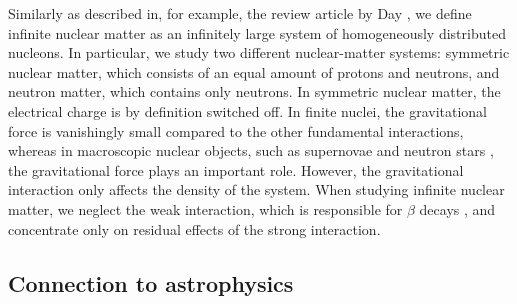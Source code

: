 \documentclass[a4paper,12pt]{report}
\begin{document}
Similarly as described in, for example, the review
article by Day \cite{day1967}, we define infinite nuclear matter
as an infinitely large system of homogeneously distributed 
nucleons. In particular, we study two different 
nuclear-matter systems: symmetric nuclear matter, which consists of 
an equal amount of protons and neutrons, and neutron matter, 
which contains only neutrons. In symmetric nuclear matter,
the electrical charge is by definition switched off. In 
finite nuclei, the gravitational force 
is vanishingly small \cite{wong_book} compared to the other 
fundamental interactions, whereas in macroscopic 
nuclear objects, such as supernovae \cite{janka_2012} 
and neutron stars \cite{heiselberg,lattimer2012}, the 
gravitational force plays an important role. However, the 
gravitational interaction only affects the density of the
system. When studying infinite nuclear matter, we neglect 
the weak interaction, which is responsible for $\beta $
decays \cite{martin_2009}, and concentrate only on residual 
effects of the strong interaction.    


\subsection{Connection to astrophysics} 
\end{document}

